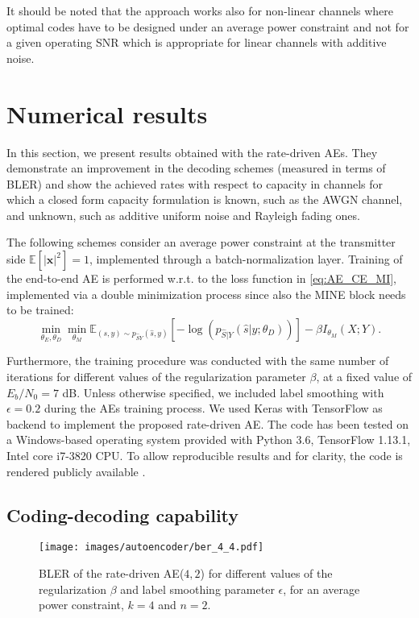 It should be noted that the approach works also for non-linear channels where optimal codes have to be designed under an average power constraint and not for a given operating SNR which is appropriate for linear channels with additive noise.

\section{Numerical results}
\label{sec:autoencoders_results}
In this section, we present results obtained with the rate-driven AEs. They demonstrate an improvement in the decoding schemes (measured in terms of BLER) and show the achieved rates with respect to capacity in channels for which a closed form capacity formulation is known, such as the AWGN channel, and unknown, such as additive uniform noise and Rayleigh fading ones.

The following schemes consider an average power constraint at the transmitter side $\mathbb{E}[|\mathbf{x}|^2] = 1 $, implemented through a batch-normalization layer. Training of the end-to-end AE is performed w.r.t. to the loss function in \eqref{eq:AE_CE_MI}, implemented via a double minimization process since also the MINE block needs to be trained:
\begin{equation}
\label{eq:AE_CE_MI_final}
\min_{\theta_E,\theta_D} \min_{\theta_M} \mathbb{E}_{(s,y)\sim p_{\hat{S}Y}(\hat{s},y)}[-\log(p_{\hat{S}|Y}(\hat{s}|y;\theta_D))]-\beta I_{\theta_M}(X;Y).
\end{equation}

Furthermore, the training procedure was conducted with the same number of iterations for different values of the regularization parameter $\beta$, at a fixed value of $E_b/N_0 = 7$ dB. Unless otherwise specified, we included label smoothing with $\epsilon=0.2$ during the AEs training process.
We used Keras with TensorFlow \cite{TensorFlow} as backend to implement the proposed rate-driven AE. The code has been tested on a Windows-based operating system provided with Python 3.6, TensorFlow 1.13.1, Intel core i7-3820 CPU. 
To allow reproducible results and for clarity, the code is rendered publicly available \cite{CACAO_github}. 

\subsection{Coding-decoding capability}
\begin{figure}
	\centering
	\texttt{[image: images/autoencoder/ber\_4\_4.pdf]}
	\caption{BLER of the rate-driven AE($4,2$) for different values of the regularization $\beta$ and label smoothing parameter $\epsilon$, for an average power constraint, $k=4$ and $n=2$.}
	\label{fig:AE_Ber_4_4}
\end{figure}

